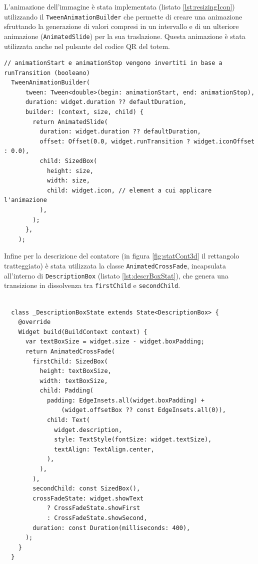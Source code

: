 L'animazione dell'immagine è stata implementata (listato \ref{lst:resizingIcon}) utilizzando il \texttt{TweenAnimationBuilder} che permette di creare una animazione sfruttando la generazione di valori compresi in un intervallo e di un ulteriore animazione (\texttt{AnimatedSlide}) per la sua traslazione. Questa animazione è stata utilizzata anche nel pulsante del codice QR del totem.

\begin{lstlisting}[style=FlutterStyle, caption={}, label={lst:resizingIcon}]
  // animationStart e animationStop vengono invertiti in base a runTransition (booleano)
  TweenAnimationBuilder(
      tween: Tween<double>(begin: animationStart, end: animationStop),
      duration: widget.duration ?? defaultDuration,
      builder: (context, size, child) {
        return AnimatedSlide(
          duration: widget.duration ?? defaultDuration,
          offset: Offset(0.0, widget.runTransition ? widget.iconOffset : 0.0),
          child: SizedBox(
            height: size,
            width: size,
            child: widget.icon, // element a cui applicare l'animazione
          ),
        );
      },
    );
\end{lstlisting}

Infine per la descrizione del contatore (in figura \ref{fig:statCont3d} il rettangolo tratteggiato) è stata utilizzata la classe \texttt{AnimatedCrossFade}, incapsulata all'interno di \texttt{DescriptionBox} (listato \ref{lst:descrBoxStat}), che genera una transizione in dissolvenza tra \texttt{firstChild} e \texttt{secondChild}. 

\begin{lstlisting}[style=FlutterStyle, caption={Stato della classe DescriptionBox che genera il widget della descrizione del contatore}, label={lst:descrBoxStat}]

  class _DescriptionBoxState extends State<DescriptionBox> {
    @override
    Widget build(BuildContext context) {
      var textBoxSize = widget.size - widget.boxPadding;
      return AnimatedCrossFade(
        firstChild: SizedBox(
          height: textBoxSize,
          width: textBoxSize,
          child: Padding(
            padding: EdgeInsets.all(widget.boxPadding) +
                (widget.offsetBox ?? const EdgeInsets.all(0)),
            child: Text(
              widget.description,
              style: TextStyle(fontSize: widget.textSize),
              textAlign: TextAlign.center,
            ),
          ),
        ),
        secondChild: const SizedBox(),
        crossFadeState: widget.showText
            ? CrossFadeState.showFirst
            : CrossFadeState.showSecond,
        duration: const Duration(milliseconds: 400),
      );
    }
  }
\end{lstlisting}
%
%
